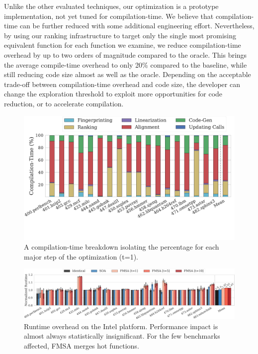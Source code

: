 Unlike the other evaluated techniques, our optimization is a prototype implementation, not yet tuned for compilation-time. We believe that
compilation-time can be further reduced with some additional engineering effort. Nevertheless, by using our ranking infrastructure to
target only the single most promising equivalent function for each function we examine, we reduce compilation-time overhead by up to two
orders of magnitude compared to the oracle. This brings the average compile-time overhead to only 20\% compared to the baseline, while
still reducing code size almost as well as the oracle. Depending on the acceptable trade-off between compilation-time overhead and code
size, the developer can change the exploration threshold to exploit more opportunities for code reduction, or to accelerate compilation.

\begin{figure}[t]
  \centering
  \includegraphics[width=1.0\linewidth]{figs/compilation-time-breakdown-sqrd.pdf}
  \caption{A compilation-time breakdown isolating the percentage for each major
           step of the optimization (t=1).}%
  \label{fig:compilation-time-breakdown}
\end{figure}

\begin{figure}[t]
  \centering
  \includegraphics[width=\linewidth]{figs/runtime-impact.pdf}
	\caption{Runtime overhead on the Intel platform. Performance impact is almost always statistically insignificant. For the few benchmarks affected, FMSA merges hot functions.}
  \label{fig:runtime-impact}
\end{figure}

